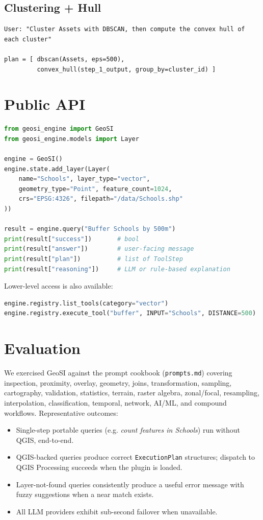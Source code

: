 \documentclass[11pt,a4paper]{article}
\begin{document}
\subsection{Clustering + Hull}
\begin{lstlisting}
User: "Cluster Assets with DBSCAN, then compute the convex hull of each cluster"

plan = [ dbscan(Assets, eps=500),
         convex_hull(step_1_output, group_by=cluster_id) ]
\end{lstlisting}

\section{Public API}
\begin{lstlisting}[language=Python]
from geosi_engine import GeoSI
from geosi_engine.models import Layer

engine = GeoSI()
engine.state.add_layer(Layer(
    name="Schools", layer_type="vector",
    geometry_type="Point", feature_count=1024,
    crs="EPSG:4326", filepath="/data/Schools.shp"
))

result = engine.query("Buffer Schools by 500m")
print(result["success"])       # bool
print(result["answer"])        # user-facing message
print(result["plan"])          # list of ToolStep
print(result["reasoning"])     # LLM or rule-based explanation
\end{lstlisting}

Lower-level access is also available:
\begin{lstlisting}[language=Python]
engine.registry.list_tools(category="vector")
engine.registry.execute_tool("buffer", INPUT="Schools", DISTANCE=500)
\end{lstlisting}

\section{Evaluation}
We exercised GeoSI against the prompt cookbook
(\texttt{prompts.md}) covering inspection, proximity, overlay,
geometry, joins, transformation, sampling, cartography, validation,
statistics, terrain, raster algebra, zonal/focal, resampling,
interpolation, classification, temporal, network, AI/ML, and compound
workflows. Representative outcomes:
\begin{itemize}[leftmargin=*]
  \item Single-step portable queries (e.g. \emph{count features in
  Schools}) run without QGIS, end-to-end.
  \item QGIS-backed queries produce correct \texttt{ExecutionPlan}
  structures; dispatch to QGIS Processing succeeds when the plugin is
  loaded.
  \item Layer-not-found queries consistently produce a useful error
  message with fuzzy suggestions when a near match exists.
  \item All LLM providers exhibit sub-second failover when unavailable.
\end{itemize}
\end{document}
